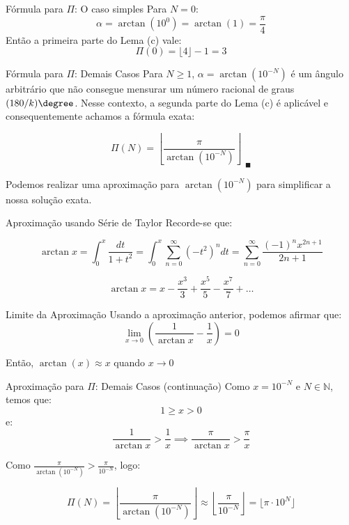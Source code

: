 \documentclass{beamer}
\begin{document}
\begin{frame}{Fórmula para $\Pi$: O caso simples}
    Para $N=0$:
    $$
    \alpha  = \arctan(10^0) = \arctan(1) = \frac{\pi}{4}
    $$
    \vspace{}
    Então a primeira parte do Lema (c) vale: 
    $$
    \Pi(0)=\lfloor4\rfloor - 1 = 3
    $$
\end{frame}

\begin{frame}{Fórmula para $\Pi$: Demais Casos}
    Para $N\ge1$, $\alpha = \arctan(10^{-N})$ é um ângulo arbitrário que não consegue mensurar um número racional de graus $(180/k)\degree$. Nesse contexto, a segunda parte do Lema (c) é aplicável e consequentemente achamos a fórmula exata:
    
    $$
    \Pi(N) = \left\lfloor\frac{\pi}{\arctan(10^{-N})}\right\rfloor_{\,\,\,\blacksquare}
    $$
    
    Podemos realizar uma aproximação para $\arctan(10^{-N})$ para simplificar a nossa solução exata. 
\end{frame}

\begin{frame}{Aproximação usando Série de Taylor}
    Recorde-se que:
    
    $$
    \arctan{x} = \int^x_0{\frac{dt}{1+t^2}} = \int^x_0 \sum^{\infty}_{n=0}(-t^2)^ndt = \sum^{\infty}_{n=0}\frac{(-1)^nx^{2n+1}}{2n+1}
    $$
    
    $$
    \arctan{x} = x - \frac{x^3}{3} + \frac{x^5}{5} - \frac{x^7}{7} + \dots
    $$
\end{frame}

\begin{frame}{Limite da Aproximação}
  Usando a aproximação anterior, podemos afirmar que:
$$
\lim_{x\rightarrow 0}\left( \frac{1}{\arctan{x}} - \frac{1}{x} \right)= 0
$$

Então, $\arctan(x) \approx x$ quando $x \rightarrow 0$
\end{frame}

\begin{frame}{Aproximação para $\Pi$: Demais Casos (continuação)}
Como $x = 10^{-N}$ e $N \in \mathbb{N}$, temos que:
$$
1\geq x>0
$$
e:
$$
\frac{1}{\arctan{x}} > \frac{1}{x} \implies \frac{\pi}{\arctan{x}} > \frac{\pi}{x}
$$


Como $\frac{\pi}{\arctan(10^{-N})}>\frac{\pi}{10^{-N}}$, logo:

$$
\Pi(N) = \left\lfloor \frac{\pi}{\arctan(10^{-N})}\right\rfloor\approx \left\lfloor \frac{\pi}{10^{-N}}\right\rfloor = \lfloor\pi \cdot 10^{N}
\rfloor$$

\end{frame}
\end{document}
